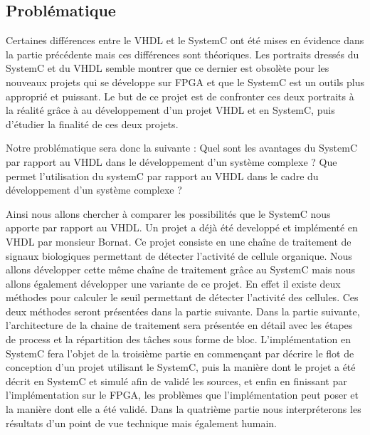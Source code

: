\documentclass[a4paper,12pt]{article}
\begin{document}

\subsection{Problématique}

Certaines différences entre le VHDL et le SystemC ont été mises en évidence dans la partie précédente mais ces différences sont théoriques. Les portraits dressés du SystemC et du VHDL semble montrer que ce dernier est obsolète pour les nouveaux projets qui se développe sur FPGA et que le SystemC est un outils plus approprié et puissant. Le but de ce projet est de confronter ces deux portraits à la réalité grâce à au développement d'un projet VHDL et en SystemC, puis d'étudier la finalité de ces deux projets.\newline

Notre problématique sera donc la suivante : Quel sont les avantages du SystemC par rapport au VHDL dans le développement d'un système complexe ?  
Que permet l’utilisation du systemC par rapport au VHDL dans le cadre du développement d’un système complexe ? \newline

Ainsi nous allons chercher à comparer les possibilités que le SystemC nous apporte par rapport au VHDL. Un projet a déjà été developpé et implémenté en VHDL par monsieur Bornat. Ce projet consiste en une chaîne de traitement de signaux biologiques permettant de détecter l'activité de cellule organique. Nous allons développer cette même chaîne de traitement grâce au SystemC mais nous allons également développer une variante de ce projet. En effet il existe deux méthodes pour calculer le seuil permettant de détecter l'activité des cellules. Ces deux méthodes seront présentées dans la partie suivante.\newline
Dans la partie suivante, l'architecture de la chaine de traitement sera présentée en détail avec les étapes de process et la répartition des tâches sous forme de bloc. L'implémentation en SystemC fera l'objet de la troisième partie en commençant par décrire le flot de conception d'un projet utilisant le SystemC, puis la manière dont le projet a été décrit en SystemC et simulé afin de validé les sources, et enfin en finissant par l'implémentation sur le FPGA, les problèmes que l'implémentation peut poser et la manière dont elle a été validé. Dans la quatrième partie nous interpréterons les résultats d'un point de vue technique mais également humain.
\newpage
\end{document}
